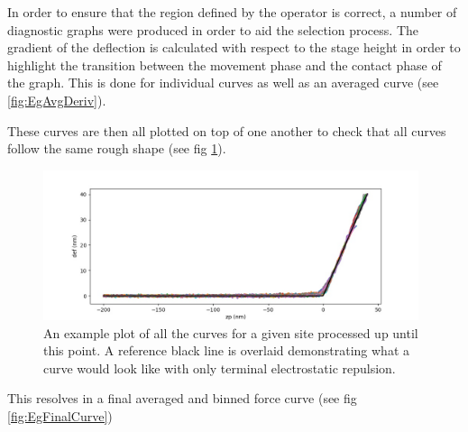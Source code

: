 In order to ensure that the region defined by the operator is correct, a number of diagnostic graphs were produced in order to aid the selection process. The gradient of the deflection is calculated with respect to the stage height in order to highlight the transition between the movement phase and the contact phase of the graph. This is done for individual curves as well as an averaged curve (see \ref{fig:EgAvgDeriv}).

\newpage

These curves are then all plotted on top of one another to check that all curves follow the same rough shape (see fig \ref{fig:proc_force_sep_mastercurve}).

\begin{figure}[h!]     %
        \begin{center}
          \includegraphics[width=110mm]{chapter4/proc_force_sep_mastercurve.jpg}
\end{center}
\caption{An example plot of all the curves for a given site processed up until this point. A reference black line is overlaid demonstrating what a curve would look like with only terminal electrostatic repulsion.}
\label{fig:proc_force_sep_mastercurve}                 %
\end{figure}






This resolves in a final averaged and binned force curve (see fig \ref{fig:EgFinalCurve})

